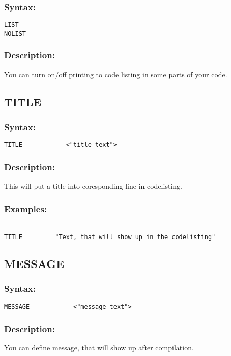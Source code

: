         \subsubsection{Syntax:}
            \verb'LIST'\\
            \verb'NOLIST'

        \subsubsection{Description:}
        You can turn on/off printing to code listing in some parts of your code.

    \subsection{TITLE}
        \subsubsection{Syntax:}
            \verb'TITLE            <"title text">'

        \subsubsection{Description:}
        This will put a title into coresponding line in codelisting.  

        \subsubsection{Examples:}
            {
                ~\\
                \usecodefont
                \verb'TITLE         "Text, that will show up in the codelisting"'
            }

    \subsection{MESSAGE}
        \subsubsection{Syntax:}
            \verb'MESSAGE            <"message text">'

        \subsubsection{Description:}
            You can define message, that will show up after compilation.  

